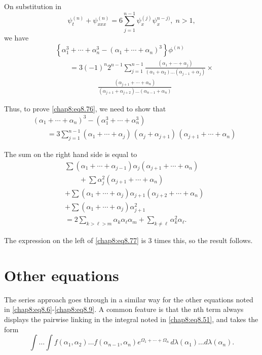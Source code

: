 On substitution in
$$
\psi_t^{(n)}+\psi_{xxx}^{(n)}=6\sum\limits_{j=1}^{n-1}\psi_x^{(j)}\psi_x^{n-j)}, \;n>1,
$$
we have 
\begin{align*}
& \left\{\alpha_1^3 +\cdots+\alpha_n^3-\left(\alpha_1+\cdots +\alpha_n\right)^3\right\}\phi^{(n)}\\
&\qquad= 3(-1)^n
  2^{n-1}\sum\limits_{j=1}^{n-1}\frac{\left(\alpha_1+\cdots+
    \alpha_j\right)}{\left(\alpha_1+\alpha_2\right)\ldots
    \left(\alpha_{j-1}+\alpha_j\right)}\times\\
&\qquad\qquad\qquad  \frac{\left(\alpha_{j+1}+\cdots
    +\alpha_n\right)}{\left(\alpha_{j+1}+\alpha_{j+2}
    \right)\ldots\left(\alpha_{n-1}+\alpha_n\right)} 
\end{align*}

Thus, to prove \eqref{chap8:eq8.76}, we need to show that 
\begin{align*}
& \left(\alpha_1+\cdots+\alpha_n\right)^3-\left(\alpha_1^3+\cdots+\alpha_n^3 \right)\\
&\qquad =3\sum_{j=1}^{n-1}\left(\alpha_1+\cdots+\alpha_j\right)\,\left(\alpha_j+ \alpha_{j+1}\right)\,\left(\alpha_{j+1}+\cdots+\alpha_n\right) \tag{8.77}\label{chap8:eq8.77}
\end{align*}

The sum on the right hand side is equal to 
\begin{align*}
&\sum\left(\alpha_1+\cdots+\alpha_{j-1}\right)\alpha_j\left(\alpha_{j+1}+\cdots+ \alpha_n\right)\\
&\qquad +\sum\alpha_j^2\left(\alpha_{j+1}+\cdots+\alpha_n\right)\\
&+\sum\left(\alpha_1+\cdots+\alpha_j\right)\alpha_{j+1}\left(\alpha_{j+2}+\cdots+ \alpha_n\right)\\
&+\sum\left(\alpha_1+\cdots+\alpha_j\right)\alpha_{j+1}^2\\
&=2\sum\limits_{k>\ell >m}\alpha_k\alpha_\ell\alpha_m+\sum\limits_{k\neq\ell} \alpha_k^2\alpha_\ell.
\end{align*}\pageoriginale

The expression on the left of \eqref{chap8:eq8.77} is 3 times this, so the result follows.

\section{Other equations}\label{chap8:sec8.8}

The series approach goes through in a similar way for the other equations noted in \eqref{chap8:eq8.6}-\eqref{chap8:eq8.9}. A common feature is that the nth term always displays the pairwise linking in the integral noted in \eqref{chap8:eq8.51}, and takes the form
\begin{equation}
\int\ldots\int f\left(\alpha_1,\alpha_2\right)\ldots f\left(\alpha_{n-1}, \alpha_n\right)e^{\Omega_1+\cdots+\Omega_n}\,d\lambda(\alpha_1)\ldots d\lambda (\alpha_n).\tag{8.88}\label{chap8:eq8.88}
\end{equation}

